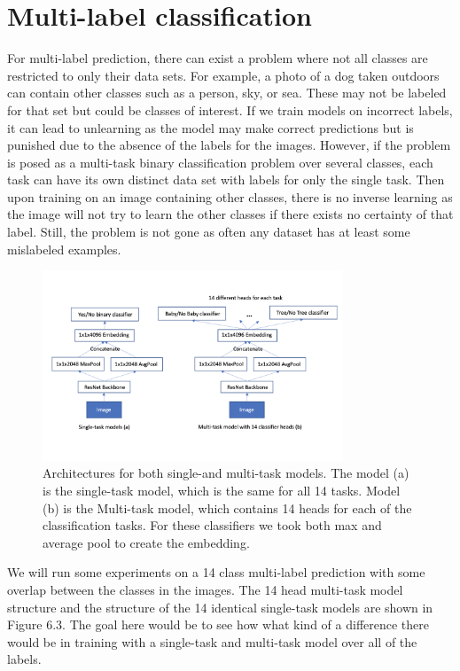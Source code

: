 \section{Multi-label classification}
For multi-label prediction, there can exist a problem where not all classes are restricted to only their data sets.
For example, a photo of a dog taken outdoors can contain other classes such as a person, sky, or sea.
These may not be labeled for that set but could be classes of interest.
If we train models on incorrect labels, it can lead to unlearning as the model may make correct predictions but is punished due to the absence of the labels for the images.
However, if the problem is posed as a multi-task binary classification problem over several classes, each task can have its own distinct data set with labels for only the single task.
Then upon training on an image containing other classes, there is no inverse learning as the image will not try to learn the other classes if there exists no certainty of that label.
Still, the problem is not gone as often any dataset has at least some mislabeled examples.

\begin{figure}[h!] 
\centering 
\includegraphics[width=0.8\textwidth]{imgs/image-labeling.png}
\caption{Architectures for both single-and multi-task models. The model (a) is the single-task model, which is the same for all 14 tasks. Model (b) is the Multi-task model, which contains 14 heads for each of the classification tasks. For these classifiers we took both max and average pool to create the embedding.}
\end{figure}

We will run some experiments on a 14 class multi-label prediction with some overlap between the classes in the images.
The 14 head multi-task model structure and the structure of the 14 identical single-task models are shown in Figure 6.3.
The goal here would be to see how what kind of a difference there would be in training with a single-task and multi-task model over all of the labels.

